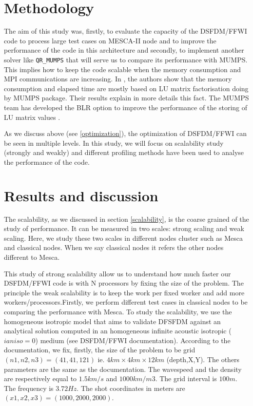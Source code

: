 \section{Methodology}
The aim of this study was, firstly, to evaluate the capacity of the DSFDM/FFWI code to process large test cases on MESCA-II node and to improve the performance of the code in this architecture and secondly, to implement another solver like \verb|QR_MUMPS| that will serve us to compare its performance with MUMPS. This implies how to keep the code scalable when the memory consumption and MPI communications are increasing. In \cite{Operto2007}, the authors show that the memory consumption and elapsed time are mostly based on LU matrix factorisation doing by MUMPS package. Their results explain in more details this fact.  The MUMPS team has developed the BLR option to improve the performance of the storing of LU matrix values \cite{Amestoy2013}. 

As we discuss above (see \ref{optimization}), the optimization of DSFDM/FFWI can be seen in multiple levels. In this study, we will focus on scalability study (strongly and weakly) and different profiling methods have been used to analyse the performance of the code.  
\section{Results and discussion}
The scalability, as we discussed in section \ref{scalability}, is the coarse grained of the study of performance. It can be measured in two scales: strong scaling and weak scaling. Here, we study these two scales in different  nodes cluster such as Mesca and classical nodes. When we say classical nodes it refers the other nodes different to Mesca.  

This study of strong scalability allow us to understand how much faster our DSFDM/FFWI code is with N processors by fixing the size of the problem. The principle the weak scalability is to keep the work per fixed worker and add more workers/processors.Firstly, we perform different test cases in classical nodes to be comparing the performance with Mesca. To study the scalability, we use the homogeneous isotropic model that aims to validate DFSFDM against an analytical solution computed in an homogeneous infinite acoustic isotropic ($ianiso=0$) medium (see DSFDM/FFWI documentation). According to the documentation, we fix, firstly, the size of the problem to be grid $(n1,n2,n3)=(41,41,121)$ ie. $ 4km \times 4km \times 12km$ (depth,X,Y). The others parameters are the same as the documentation. The wavespeed and the density are respectively equal to $ 1.5km/s $ and $ 1000km/m3 $. The grid interval is $ 100m$. The frequency is $3.72Hz$. The shot coordinates in meters are $ (x1, x2, x3) = (1000, 2000, 2000)$.

